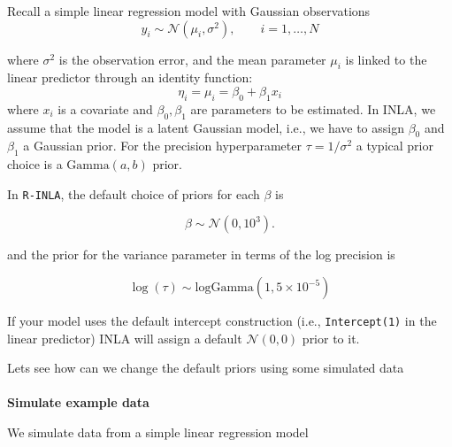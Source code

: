\documentclass[
  letterpaper,
  DIV=11,
  numbers=noendperiod]{scrartcl}
\makeatletter
\let\oldparagraph\paragraph
\renewcommand{\paragraph}{
    \@ifstar
      \xxxParagraphStar
      \xxxParagraphNoStar
  }
\newcommand{\xxxParagraphStar}[1]{\oldparagraph*{#1}\mbox{}}
\newcommand{\xxxParagraphNoStar}[1]{\oldparagraph{#1}\mbox{}}
\makeatother
\begin{document}
Recall a simple linear regression model with Gaussian observations \[
y_i\sim\mathcal{N}(\mu_i, \sigma^2), \qquad i = 1,\dots,N
\]

where \(\sigma^2\) is the observation error, and the mean parameter
\(\mu_i\) is linked to the linear predictor through an identity
function: \[
\eta_i = \mu_i = \beta_0 + \beta_1 x_i
\] where \(x_i\) is a covariate and \(\beta_0, \beta_1\) are parameters
to be estimated. In INLA, we assume that the model is a latent Gaussian
model, i.e., we have to assign \(\beta_0\) and \(\beta_1\) a Gaussian
prior. For the precision hyperparameter \(\tau = 1/\sigma^2\) a typical
prior choice is a \(\text{Gamma}(a,b)\) prior.

In \texttt{R-INLA}, the default choice of priors for each \(\beta\) is

\[
\beta \sim \mathcal{N}(0,10^3).
\]

and the prior for the variance parameter in terms of the log precision
is

\[ \log(\tau) \sim \mathrm{logGamma}(1,5 \times 10^{-5}) \]

\begin{tcolorbox}[enhanced jigsaw, coltitle=black, breakable, colbacktitle=quarto-callout-note-color!10!white, bottomtitle=1mm, toprule=.15mm, colframe=quarto-callout-note-color-frame, rightrule=.15mm, title=\textcolor{quarto-callout-note-color}{\faInfo}\hspace{0.5em}{Note}, arc=.35mm, toptitle=1mm, opacityback=0, titlerule=0mm, left=2mm, bottomrule=.15mm, leftrule=.75mm, opacitybacktitle=0.6, colback=white]

If your model uses the default intercept construction (i.e.,
\texttt{Intercept(1)} in the linear predictor) INLA will assign a
default \(\mathcal{N} (0,0)\) prior to it.

\end{tcolorbox}

Lets see how can we change the default priors using some simulated data

\paragraph{\texorpdfstring{\textbf{Simulate example
data}}{Simulate example data}}\label{simulate-example-data}

We simulate data from a simple linear regression model
\end{document}
